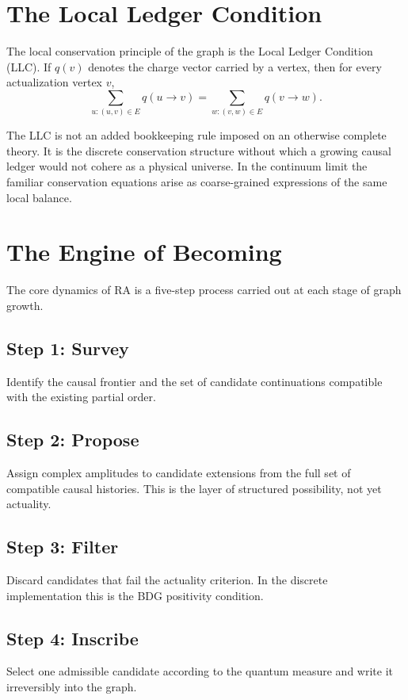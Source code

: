 \documentclass[11pt]{article}
\begin{document}
\section{The Local Ledger Condition}
The local conservation principle of the graph is the Local Ledger Condition (LLC). If $q(v)$ denotes the charge vector carried by a vertex, then for every actualization vertex $v$,
\begin{equation}
\sum_{u:(u,v)\in E} q(u\to v)=\sum_{w:(v,w)\in E} q(v\to w).
\end{equation}

The LLC is not an added bookkeeping rule imposed on an otherwise complete theory. It is the discrete conservation structure without which a growing causal ledger would not cohere as a physical universe. In the continuum limit the familiar conservation equations arise as coarse-grained expressions of the same local balance.

\section{The Engine of Becoming}
The core dynamics of RA is a five-step process carried out at each stage of graph growth.

\subsection*{Step 1: Survey}
Identify the causal frontier and the set of candidate continuations compatible with the existing partial order.

\subsection*{Step 2: Propose}
Assign complex amplitudes to candidate extensions from the full set of compatible causal histories. This is the layer of structured possibility, not yet actuality.

\subsection*{Step 3: Filter}
Discard candidates that fail the actuality criterion. In the discrete implementation this is the BDG positivity condition.

\subsection*{Step 4: Inscribe}
Select one admissible candidate according to the quantum measure and write it irreversibly into the graph.
\end{document}
